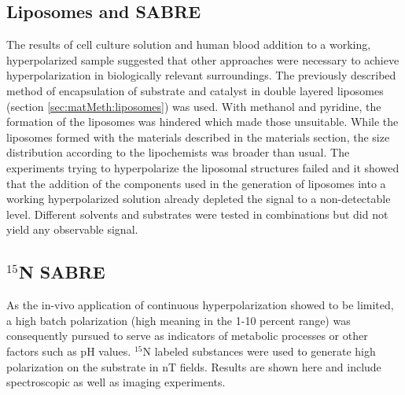     \subsection{Liposomes and SABRE}
    \label{sec:results:liposomes}
    The results of cell culture solution and human blood addition to a working, hyperpolarized sample suggested that other approaches were necessary to achieve hyperpolarization in biologically relevant surroundings. The previously described method of encapsulation of substrate and catalyst in double layered liposomes (section \ref{sec:matMeth:liposomes}) was used. With methanol and pyridine, the formation of the liposomes was hindered which made those unsuitable. While the liposomes formed with the materials described in the materials section, the size distribution according to the lipochemists was broader than usual. The experiments trying to hyperpolarize the liposomal structures failed and it showed that the addition of the components used in the generation of liposomes into a working hyperpolarized solution already depleted the signal to a non-detectable level. Different solvents and substrates were tested in combinations but did not yield any observable signal.  
\subsection{$^{15}$N SABRE}
    As the in-vivo application of continuous hyperpolarization showed to be limited, a high batch polarization (high meaning in the 1-10 percent range) was consequently pursued to serve as indicators of metabolic processes or other factors such as pH values.
        $^{15}\mathrm{N}$ labeled substances were used to generate high polarization on the substrate in \si{\nano\tesla} fields. Results are shown here and include spectroscopic as well as imaging experiments.
